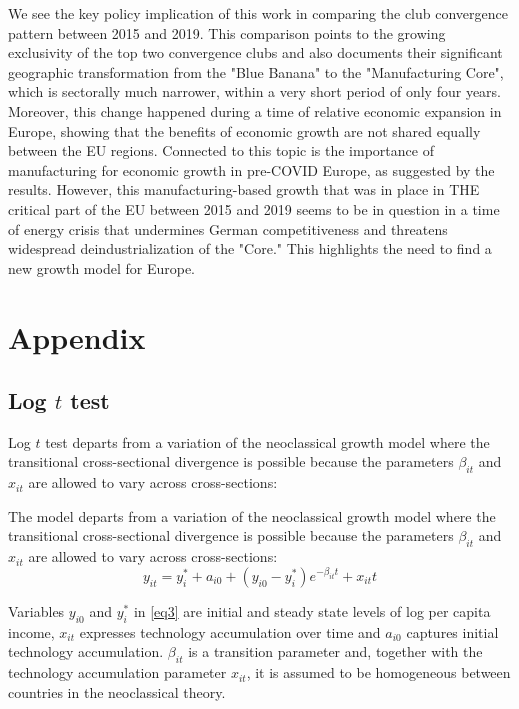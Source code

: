 \documentclass[11pt]{article}
\begin{document}
We see the key policy implication of this work in comparing the club convergence pattern between 2015 and 2019. This comparison points to the growing exclusivity of the top two convergence clubs and also documents their significant geographic transformation from the "Blue Banana" to the "Manufacturing Core", which is sectorally much narrower, within a very short period of only four years. Moreover, this change happened during a time of relative economic expansion in Europe, showing that the benefits of economic growth are not shared equally between the EU regions. Connected to this topic is the importance of manufacturing for economic growth in pre-COVID Europe, as suggested by the results. However, this manufacturing-based growth that was in place in THE critical part of the EU between 2015 and 2019 seems to be in question in a time of energy crisis that undermines German competitiveness and threatens widespread deindustrialization of the "Core." This highlights the need to find a new growth model for Europe.



\newpage


\appendix
\section{Appendix}

\subsection{Log $t$ test}

Log $t$ test departs from a variation of the neoclassical growth model where the transitional cross-sectional divergence is possible because the parameters $\beta_{it}$ and $x_{it}$ are allowed to vary across cross-sections:

The model departs from a variation of the neoclassical growth model where the transitional cross-sectional divergence is possible because the parameters $\beta_{it}$ and $x_{it}$ are allowed to vary across cross-sections:
\begin{equation} \label{eq3}
 y_{it} = y_i^* + a_{i0} + (y_{i0} - y_i^*)e^{-\beta_{it}t} + x_{it}t 
\end{equation}

 Variables $y_{i0}$ and $y_{i}^{*}$ in \eqref{eq3} are initial and steady state levels of log per capita income, $x_{it}$ expresses technology accumulation over time and $a_{i0}$ captures initial technology accumulation. $\beta_{it}$ is a transition parameter and, together with the technology accumulation parameter $x_{it}$, it is assumed to be homogeneous between countries in the neoclassical theory.
\end{document}
